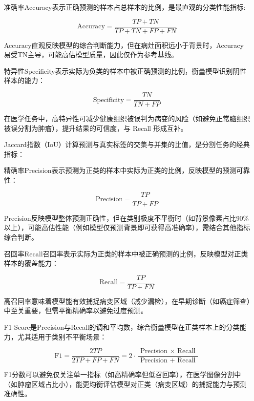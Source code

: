 准确率Accuracy表示正确预测的样本占总样本的比例，是最直观的分类性能指标:

\begin{equation}
    \mathrm{Accuracy}=\frac{TP+TN}{TP+TN+FP+FN}
\end{equation}

Accuracy直观反映模型的综合判断能力，但在病灶面积远小于背景时，Accuracy易受TN主导，可能高估模型质量，因此仅作为参考基线。

特异性Specificity表示实际为负类的样本中被正确预测的比例，衡量模型识别阴性样本的能力：

\begin{equation}
    \mathrm{Specificity}=\frac{T N}{T N+F P}
\end{equation}

在医学任务中，高特异性可减少健康组织被误判为病变的风险（如避免正常脑组织被误分割为肿瘤），提升结果的可信度，与 Recall 形成互补。

Jaccard指数（IoU）计算预测与真实标签的交集与并集的比值，是分割任务的经典指标：

精确率Precision表示预测为正类的样本中实际为正类的比例，反映模型的预测可靠性：

\begin{equation}
    \mathrm{Precision}=\frac{T P}{T P+F P}
\end{equation}

Precision反映模型整体预测正确性，但在类别极度不平衡时（如背景像素占比90\%以上），可能高估性能（例如模型仅预测背景即可获得高准确率），需结合其他指标综合判断。

召回率Recall召回率表示实际为正类的样本中被正确预测的比例，反映模型对正类样本的覆盖能力：

\begin{equation}
    \mathrm{Recall}=\frac{T P}{T P+F N} 
\end{equation}

高召回率意味着模型能有效捕捉病变区域（减少漏检），在早期诊断（如癌症筛查）中至关重要，但需平衡精确率以避免过度预测。

F1-Score是Precision与Recall的调和平均数，综合衡量模型在正类样本上的分类能力，尤其适用于类别不平衡场景：

\begin{equation}
    \mathrm{F} 1=\frac{2 T P}{2 T P+F P+F N}=2 \cdot \frac{\text { Precision } \times \text { Recall }}{\text { Precision }+ \text { Recall }}
\end{equation}

F1分数可以避免仅关注单一指标（如高精确率但低召回率），在医学图像分割中（如肿瘤区域占比小），能更均衡评估模型对正类（病变区域）的捕捉能力与预测准确性。

